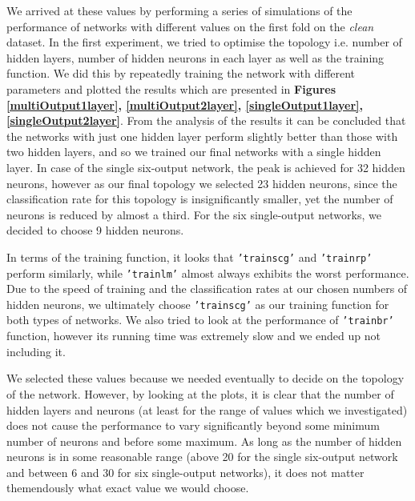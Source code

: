 \documentclass[a4paper]{article}
\begin{document}
We arrived at these values by performing a series of simulations of the performance of networks with different values on the first fold on the \emph{clean} dataset. In the first experiment, we tried to optimise the topology i.e. number of hidden layers, number of hidden neurons in each layer as well as the training function. We did this by repeatedly training the network with different parameters and plotted the results which are presented in \textbf{Figures \ref{multiOutput1layer}, \ref{multiOutput2layer}, \ref{singleOutput1layer}, \ref{singleOutput2layer}}. From the analysis of the results it can be concluded that the networks with just one hidden layer perform slightly better than those with two hidden layers, and so we trained our final networks with a single hidden layer. In case of the single six-output network, the peak is achieved for 32 hidden neurons, however as our final topology we selected 23 hidden neurons, since the classification rate for this topology is insignificantly smaller, yet the number of neurons is reduced by almost a third. For the six single-output networks, we decided to choose 9 hidden neurons. \medskip

In terms of the training function, it looks that \texttt{'trainscg'} and \texttt{'trainrp'} perform similarly, while \texttt{'trainlm'} almost always exhibits the worst performance. Due to the speed of training and the classification rates at our chosen numbers of hidden neurons, we ultimately choose \texttt{'trainscg'} as our training function for both types of networks. We also tried to look at the performance of \texttt{'trainbr'} function, however its running time was extremely slow and we ended up not including it. \medskip

We selected these values because we needed eventually to decide on the topology of the network. However, by looking at the plots, it is clear that the number of hidden layers and neurons (at least for the range of values which we investigated) does not cause the performance to vary significantly beyond some minimum number of neurons and before some maximum. As long as the number of hidden neurons is in some reasonable range (above 20 for the single six-output network and between 6 and 30 for six single-output networks), it does not matter themendously what exact value we would choose.
\end{document}
